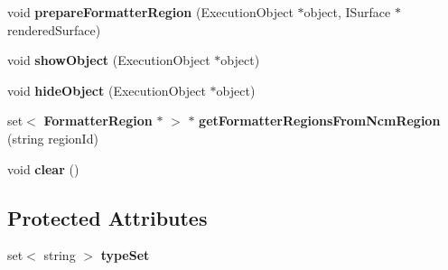 \begin{CompactItemize}
\item 
void \textbf{prepareFormatterRegion} (ExecutionObject $\ast$object, ISurface $\ast$renderedSurface)\label{classbr_1_1pucrio_1_1telemidia_1_1ginga_1_1ncl_1_1model_1_1presentation_1_1FormatterLayout_26b0242deb15dca84abca9fae33af726}

\item 
void \textbf{showObject} (ExecutionObject $\ast$object)\label{classbr_1_1pucrio_1_1telemidia_1_1ginga_1_1ncl_1_1model_1_1presentation_1_1FormatterLayout_633c6a1d6b767afce9c90f1e557786ad}

\item 
void \textbf{hideObject} (ExecutionObject $\ast$object)\label{classbr_1_1pucrio_1_1telemidia_1_1ginga_1_1ncl_1_1model_1_1presentation_1_1FormatterLayout_e92309574fa337dbe79478ce3d52f941}

\item 
set$<$ {\bf FormatterRegion} $\ast$ $>$ $\ast$ \textbf{getFormatterRegionsFromNcmRegion} (string regionId)\label{classbr_1_1pucrio_1_1telemidia_1_1ginga_1_1ncl_1_1model_1_1presentation_1_1FormatterLayout_543eb6f453c70eb41d9f3ba8ab9f0f11}

\item 
void \textbf{clear} ()\label{classbr_1_1pucrio_1_1telemidia_1_1ginga_1_1ncl_1_1model_1_1presentation_1_1FormatterLayout_c8bb3912a3ce86b15842e79d0b421204}

\end{CompactItemize}
\subsection*{Protected Attributes}
\begin{CompactItemize}
\item 
set$<$ string $>$ {\bf typeSet}\label{classbr_1_1pucrio_1_1telemidia_1_1ginga_1_1ncl_1_1model_1_1presentation_1_1FormatterLayout_145b3afaa194308141d367cc1393d565}

\end{CompactItemize}
